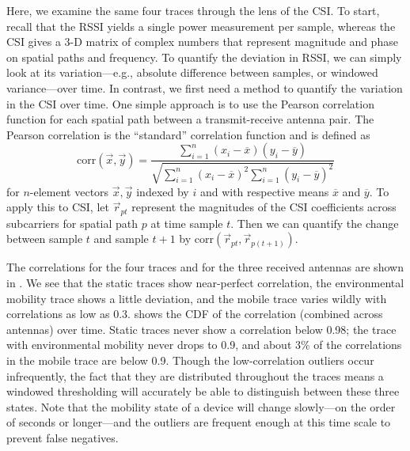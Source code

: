  Here, we examine the same four traces through the lens of the CSI\@. To start, recall that the RSSI yields a single power measurement per sample, whereas the CSI gives a 3-D matrix of complex numbers that represent magnitude and phase on spatial paths and frequency. To quantify the deviation in RSSI, we can simply look at its variation---e.g., absolute difference between samples, or windowed variance---over time. In contrast, we first need a method to quantify the variation in the CSI over time. One simple approach is to use the Pearson correlation function for each spatial path between a transmit-receive antenna pair. The Pearson correlation is the ``standard'' correlation function and is defined as
\[
\text{corr}(\vec{x},\vec{y}) = \frac{\sum_{i=1}^n(x_i-\overline{x})(y_i-\overline{y})}{\sqrt{\sum_{i=1}^n(x_i-\overline{x})^2 \sum_{i=1}^n(y_i-\overline{y})^2}}
\]
for $n$-element vectors $\vec{x},\vec{y}$ indexed by $i$ and with respective means $\overline{x}$ and $\overline{y}$. To apply this to CSI, let $\vec{r}_{pt}$ represent the magnitudes of the CSI coefficients across subcarriers for spatial path $p$ at time sample $t$. Then we can quantify the change between sample $t$ and sample $t+1$ by $\text{corr}(\vec{r}_{pt},\vec{r}_{p(t+1)})$.

The correlations for the four traces and for the three received antennas are shown in . We see that the static traces show near-perfect correlation, the environmental mobility trace shows a little deviation, and the mobile trace varies wildly with correlations as low as 0.3.  shows the CDF of the correlation (combined across antennas) over time. Static traces never show a correlation below 0.98; the trace with environmental mobility never drops to 0.9, and about 3\% of the correlations in the mobile trace are below 0.9. Though the low-correlation outliers occur infrequently, the fact that they are distributed throughout the traces means a windowed thresholding will accurately be able to distinguish between these three states. Note that the mobility state of a device will change slowly---on the order of seconds or longer---and the outliers are frequent enough at this time scale to prevent false negatives.


